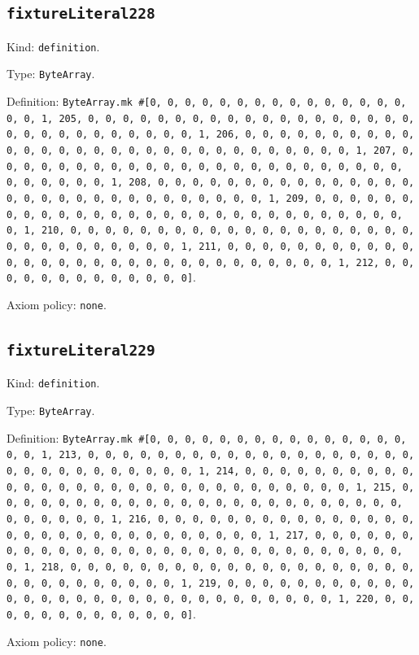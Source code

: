 \documentclass[11pt]{article}
\begin{document}
\subsection*{\texttt{fixtureLiteral228}}
\noindent Kind: \texttt{definition}.\par
\noindent Type: \texttt{ByteArray}.\par
\noindent Definition: \texttt{ByteArray.mk \#[0, 0, 0, 0, 0, 0, 0, 0, 0, 0, 0, 0, 0, 0, 0, 0, 0, 1, 205, 0, 0, 0, 0, 0, 0, 0, 0, 0, 0, 0, 0, 0, 0, 0, 0, 0, 0, 0, 0, 0, 0, 0, 0, 0, 0, 0, 0, 0, 0, 1, 206, 0, 0, 0, 0, 0, 0, 0, 0, 0, 0, 0, 0, 0, 0, 0, 0, 0, 0, 0, 0, 0, 0, 0, 0, 0, 0, 0, 0, 0, 0, 1, 207, 0, 0, 0, 0, 0, 0, 0, 0, 0, 0, 0, 0, 0, 0, 0, 0, 0, 0, 0, 0, 0, 0, 0, 0, 0, 0, 0, 0, 0, 0, 1, 208, 0, 0, 0, 0, 0, 0, 0, 0, 0, 0, 0, 0, 0, 0, 0, 0, 0, 0, 0, 0, 0, 0, 0, 0, 0, 0, 0, 0, 0, 0, 1, 209, 0, 0, 0, 0, 0, 0, 0, 0, 0, 0, 0, 0, 0, 0, 0, 0, 0, 0, 0, 0, 0, 0, 0, 0, 0, 0, 0, 0, 0, 0, 1, 210, 0, 0, 0, 0, 0, 0, 0, 0, 0, 0, 0, 0, 0, 0, 0, 0, 0, 0, 0, 0, 0, 0, 0, 0, 0, 0, 0, 0, 0, 0, 1, 211, 0, 0, 0, 0, 0, 0, 0, 0, 0, 0, 0, 0, 0, 0, 0, 0, 0, 0, 0, 0, 0, 0, 0, 0, 0, 0, 0, 0, 0, 0, 1, 212, 0, 0, 0, 0, 0, 0, 0, 0, 0, 0, 0, 0, 0]}.\par
\noindent Axiom policy: \texttt{none}.\par
\subsection*{\texttt{fixtureLiteral229}}
\noindent Kind: \texttt{definition}.\par
\noindent Type: \texttt{ByteArray}.\par
\noindent Definition: \texttt{ByteArray.mk \#[0, 0, 0, 0, 0, 0, 0, 0, 0, 0, 0, 0, 0, 0, 0, 0, 0, 1, 213, 0, 0, 0, 0, 0, 0, 0, 0, 0, 0, 0, 0, 0, 0, 0, 0, 0, 0, 0, 0, 0, 0, 0, 0, 0, 0, 0, 0, 0, 0, 1, 214, 0, 0, 0, 0, 0, 0, 0, 0, 0, 0, 0, 0, 0, 0, 0, 0, 0, 0, 0, 0, 0, 0, 0, 0, 0, 0, 0, 0, 0, 0, 1, 215, 0, 0, 0, 0, 0, 0, 0, 0, 0, 0, 0, 0, 0, 0, 0, 0, 0, 0, 0, 0, 0, 0, 0, 0, 0, 0, 0, 0, 0, 0, 1, 216, 0, 0, 0, 0, 0, 0, 0, 0, 0, 0, 0, 0, 0, 0, 0, 0, 0, 0, 0, 0, 0, 0, 0, 0, 0, 0, 0, 0, 0, 0, 1, 217, 0, 0, 0, 0, 0, 0, 0, 0, 0, 0, 0, 0, 0, 0, 0, 0, 0, 0, 0, 0, 0, 0, 0, 0, 0, 0, 0, 0, 0, 0, 1, 218, 0, 0, 0, 0, 0, 0, 0, 0, 0, 0, 0, 0, 0, 0, 0, 0, 0, 0, 0, 0, 0, 0, 0, 0, 0, 0, 0, 0, 0, 0, 1, 219, 0, 0, 0, 0, 0, 0, 0, 0, 0, 0, 0, 0, 0, 0, 0, 0, 0, 0, 0, 0, 0, 0, 0, 0, 0, 0, 0, 0, 0, 0, 1, 220, 0, 0, 0, 0, 0, 0, 0, 0, 0, 0, 0, 0, 0]}.\par
\noindent Axiom policy: \texttt{none}.\par
\end{document}
